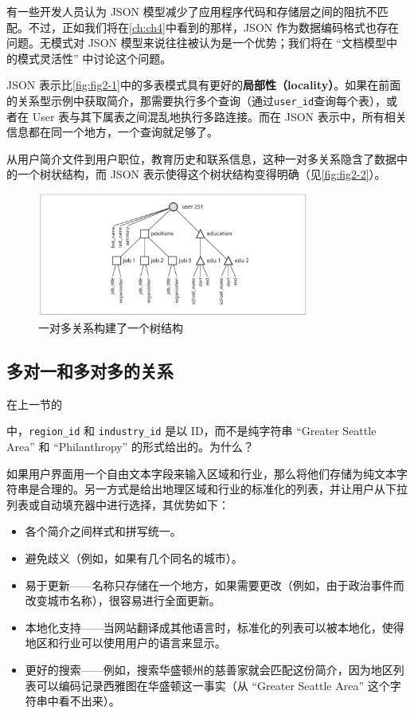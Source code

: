 有一些开发人员认为 JSON 模型减少了应用程序代码和存储层之间的阻抗不匹配。不过，正如我们将在\autoref{ch:ch4}中看到的那样，JSON 作为数据编码格式也存在问题。无模式对 JSON 模型来说往往被认为是一个优势；我们将在 “文档模型中的模式灵活性” 中讨论这个问题。

JSON 表示比\autoref{fig:fig2-1}中的多表模式具有更好的\textbf{局部性（locality）}。如果在前面的关系型示例中获取简介，那需要执行多个查询（通过\texttt{user\_id}查询每个表），或者在 User 表与其下属表之间混乱地执行多路连接。而在 JSON 表示中，所有相关信息都在同一个地方，一个查询就足够了。

从用户简介文件到用户职位，教育历史和联系信息，这种一对多关系隐含了数据中的一个树状结构，而 JSON 表示使得这个树状结构变得明确（见\autoref{fig:fig2-2}）。

\begin{figure}[htb]
    \includegraphics[width=0.8\textwidth]{img/fig2-2.png}
    \caption{一对多关系构建了一个树结构}
    \label{fig:fig2-2}
\end{figure}

\subsection{多对一和多对多的关系}

在上一节的\author{exa:example2-1}中，\texttt{region\_id} 和 \texttt{industry\_id} 是以 ID，而不是纯字符串 “Greater Seattle Area” 和 “Philanthropy” 的形式给出的。为什么？

如果用户界面用一个自由文本字段来输入区域和行业，那么将他们存储为纯文本字符串是合理的。另一方式是给出地理区域和行业的标准化的列表，并让用户从下拉列表或自动填充器中进行选择，其优势如下：

\begin{itemize}
    \item 各个简介之间样式和拼写统一。
    \item 避免歧义（例如，如果有几个同名的城市）。
    \item 易于更新——名称只存储在一个地方，如果需要更改（例如，由于政治事件而改变城市名称），很容易进行全面更新。
    \item 本地化支持——当网站翻译成其他语言时，标准化的列表可以被本地化，使得地区和行业可以使用用户的语言来显示。
    \item 更好的搜索——例如，搜索华盛顿州的慈善家就会匹配这份简介，因为地区列表可以编码记录西雅图在华盛顿这一事实（从 “Greater Seattle Area” 这个字符串中看不出来）。
\end{itemize}

